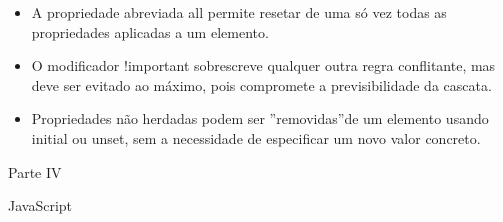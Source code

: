 \begin{itemize}
  \item A propriedade abreviada all permite resetar de uma só vez todas as propriedades aplicadas a um elemento.
\end{itemize}

\begin{itemize}
  \item O modificador !important sobrescreve qualquer outra regra conflitante, mas deve ser evitado ao máximo, pois compromete a previsibilidade da cascata.
\end{itemize}

\begin{itemize}
  \item Propriedades não herdadas podem ser ”removidas”de um elemento usando initial ou unset, sem a necessidade de especificar um novo valor concreto.
\end{itemize}

Parte IV

\begin{codebox}{JavaScript}

\end{codebox}
